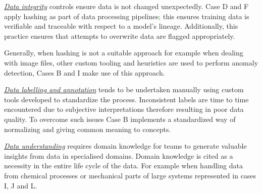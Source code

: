 \underline{\emph{Data integrity}}
controls ensure data is not changed unexpectedly. Case D and F apply hashing as part of data processing pipelines\textcolor{green}{;} this ensures training data is verifiable and traceable with respect to a model's lineage. Additionally, this practice ensures that attempts to overwrite data are flagged appropriately.

Generally, when hashing is not a suitable approach for example when dealing with image files, other custom tooling and heuristics are used to perform anomaly detection, Cases B and I make use of this approach. %

% 


\underline{\emph{Data labelling and annotation}} tends to be undertaken manually using custom tools developed to standardize the process. %
Inconsistent labels are time to time encountered due to subjective interpretations therefore resulting in poor data quality. To overcome such issues Case B implements a standardized way of normalizing and giving common meaning to concepts. %

\underline{\emph{Data understanding}} requires domain knowledge for teams to generate valuable insights from data in specialised domains. Domain knowledge is cited as a necessity in the entire life cycle of the data. For example when handling data from chemical processes or mechanical parts of large systems represented in cases I, J and L. %

